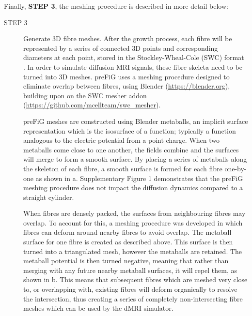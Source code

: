 Finally, \textbf{\sffamily STEP 3}, the meshing procedure is described in more detail below:
\begin{description}
  \item [STEP 3] Generate 3D fibre meshes. After the growth process, each fibre will be represented by a series of connected 3D points and corresponding diameters at each point, stored in the Stockley-Wheal-Cole (SWC) format \cite{Stockley1993}. In order to simulate diffusion MRI signals, these fibre skeleta need to be turned into 3D meshes. \ac{preFiG} uses a meshing procedure designed to eliminate overlap between fibres, using Blender (\url{https://blender.org}), building upon on the SWC mesher addon (\url{https://github.com/mcellteam/swc_mesher}).

\ac{preFiG} meshes are constructed using Blender metaballs, an implicit surface representation which is the isosurface of a function; typically a function analogous to the electric potential from a point charge. When two metaballs come close to one another, the fields combine and the surfaces will merge to form a smooth surface. By placing a series of metaballs along the skeleton of each fibre, a smooth surface is formed for each fibre one-by-one as shown in a. Supplementary Figure 1 demonstrates that the \ac{preFiG} meshing procedure does not impact the diffusion dynamics compared to a straight cylinder.

When fibres are densely packed, the surfaces from neighbouring fibres may overlap. To account for this, a meshing procedure was developed in which fibres can deform around nearby fibres to avoid overlap. The metaball surface for one fibre is created as described above. This surface is then turned into a triangulated mesh, however the metaballs are retained. The metaball potential is then turned negative, meaning that rather than merging with any future nearby metaball surfaces, it will repel them, as shown in b. This means that subsequent fibres which are meshed very close to, or overlapping with, existing fibres will deform organically to resolve the intersection, thus creating a series of completely non-intersecting fibre meshes which can be used by the dMRI simulator.

\end{description}


